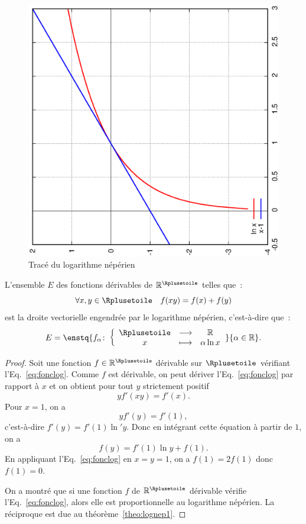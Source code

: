 %
\begin{figure}
  \centering
  \includegraphics[scale=0.4, angle=-90]{lognep.ps}
  \caption{Tracé du logarithme népérien}
  \label{fig:traceln}
\end{figure}
%
\begin{theo}
  L'ensemble $E$ des fonctions dérivables de $\R^{\Rplusetoile}$ telles que~:
  \begin{equation} 
    \label{eq:fonclog}
    \forall x, y \in \Rplusetoile \quad f(xy)=f(x)+f(y)
  \end{equation}
  est la droite vectorielle engendrée par le logarithme népérien, c'est-à-dire que~: 
  \begin{equation}
    E=\enstq{\fonction{f_{\alpha}}{\Rplusetoile}{\R}{x}{\alpha \ln x}}{\alpha \in \R}.
  \end{equation}
\end{theo}
\begin{proof}
  Soit une fonction $f \in \R^{\Rplusetoile}$ dérivable sur $\Rplusetoile$ vérifiant l'Eq.~\eqref{eq:fonclog}. Comme $f$ est dérivable, on peut dériver l'Eq.~\eqref{eq:fonclog} par rapport à $x$ et on obtient pour tout $y$ strictement positif
  \begin{equation} 
    y f'(xy)=f'(x).
  \end{equation}
  Pour $x=1$, on a 
  \begin{equation}
    y f'(y)=f'(1),
  \end{equation}
  c'est-à-dire $f'(y)=f'(1) \ln' y$. Donc en intégrant cette équation à partir de $1$, on a
  \begin{equation}
    f(y)=f'(1)\ln y + f(1).
  \end{equation}
  En appliquant l'Eq.~\eqref{eq:fonclog} en $x=y=1$, on a $f(1)=2f(1)$ donc $f(1)=0$.

  On a montré que si une fonction $f$ de $\R^{\Rplusetoile}$ dérivable vérifie l'Eq.~\eqref{eq:fonclog}, alors elle est proportionnelle au logarithme népérien. La réciproque est due au théorème~\ref{theo:lognep1}. 
\end{proof}
%
